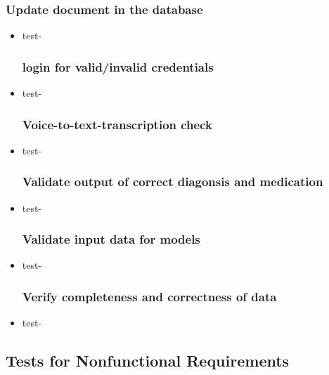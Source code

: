 \documentclass[12pt, titlepage]{article}
\begin{document}
\subsubsection{Update document in the database} \label{section:4.1.3}

\begin{itemize}
\item{test-}\label{test-}


\subsubsection{login for valid/invalid credentials} \label{section:4.1.4}

\item{test-}\label{test-}


\subsubsection{Voice-to-text-transcription check} \label{section:4.1.5}

\item{test-} \label{test-}


\subsubsection{Validate output of correct diagonsis and medication} \label{section:4.1.6}

\item{test-} \label{test-}


\subsubsection{Validate input data for models} \label{section:4.1.7}

\item{test-} \label{test-}


\subsubsection{Verify completeness and correctness of data} \label{section:4.1.8}

\item{test-} \label{test-}
\end{itemize}



\subsection{Tests for Nonfunctional Requirements} \label{section:4.2}
\end{document}
